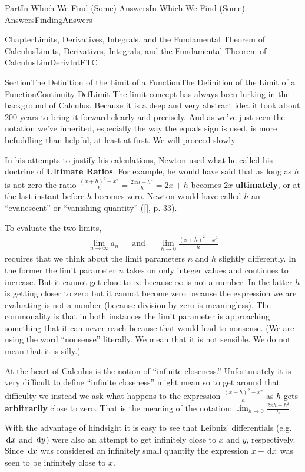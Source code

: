 \documentclass[oneside,10pt,]{book}
\newcommand{\xreffont}{\relax}
\newcommand{\terminology}[1]{\textbf{#1}}
\numberwithin{equation}{part}
\newcommand{\dx}[1]{\,{\rm d}#1}
\def\limit#1#2#3{{\displaystyle\lim_{#1\rightarrow #2}#3}}
\def\limitt#1#2#3{{\displaystyle\lim_{#1\rightarrow #2}\textstyle #3}}
\newcommand{\amp}{&}
\begin{document}
\begin{partptx}{Part}{In Which We Find (Some) Answers}{}{In Which We Find (Some) Answers}{}{}{FindingAnswers}
\begin{chapterptx}{Chapter}{Limits, Derivatives, Integrals, and the Fundamental Theorem of Calculus}{}{Limits, Derivatives, Integrals, and the Fundamental Theorem of Calculus}{}{}{LimDerivIntFTC}
\begin{sectionptx}{Section}{The Definition of the Limit of a Function}{}{The Definition of the Limit of a Function}{}{}{Continuity-DefLimit}
The limit concept has always been lurking in the background of Calculus.  Because it is a deep and very abstract idea it took about \(200\) years to bring it forward clearly and precisely. And as we've just seen the notation we've inherited, especially the way the equals sign is used, is more befuddling than helpful, at least at first.  We will proceed slowly.%
\par
{} In his attempts to justify his calculations, Newton used what he called his doctrine of \terminology{Ultimate Ratios}. For example, he would have said that as long as \(h\) is not zero the ratio \(\frac{(x+h)^2-x^2}{h} = \frac{2xh+h^2}{h} =
2x+h\) becomes \(2x\) \terminology{ultimately}, or at the last instant before \(h\) becomes zero. Newton would have called \(h\) an ``evanescent'' or ``vanishing quantity'' (\hyperlink{grabiner81__origin_cauch_rigor_calculy}{[{\xreffont 4}]}, p. 33).%
\par
     To evaluate the two limits,%
\begin{align*}
\limit{n}{\infty}{a_n}\amp{}\amp{} \text{and}\amp{}\amp{}\limit{h}{0}{\frac{(x+h)^2-x^2}{h}}
\end{align*}
requires that we think about the limit parameters \(n\) and \(h\) slightly differently. In the former the limit parameter \(n\) takes on only integer values and continues to increase. But it cannot get close to \(\infty \) because \(\infty\) is not a number.  In the latter \(h\) is getting closer to zero but it cannot become zero because the expression we are evaluating is not a number (because division by zero is meaningless). The commonality is that in both instances the limit parameter is approaching something that it can never reach because that would lead to nonsense.              (We are using the word ``nonsense'' literally. We mean that it is not sensible. We do not mean that it is silly.)%
\par
At the heart of Calculus is the notion of ``infinite closeness.'' Unfortunately it is very difficult to define ``infinite closeness'' might mean so to get around that difficulty we instead we ask what happens to the expression \(\frac{(x+h)^2-x^2}{h}\) as \(h\) gets \terminology{arbitrarily} close to zero. That is the meaning of the notation: \(\limitt{h}{0}{\frac{2xh+h^2}{h}}\).%
\par
{} With the advantage of hindsight it is easy to see that Leibniz' differentials (e.g. \(\dx{x}\) and \(\dx{y}\)) were also an attempt to get infinitely close to \(x\) and \(y\), respectively. Since \(\dx{x}\) was considered an infinitely small quantity the expression \(x+\dx{x}\) was seen to be infinitely close to \(x\).%

\end{sectionptx}
\end{chapterptx}
\end{partptx}
\end{document}

